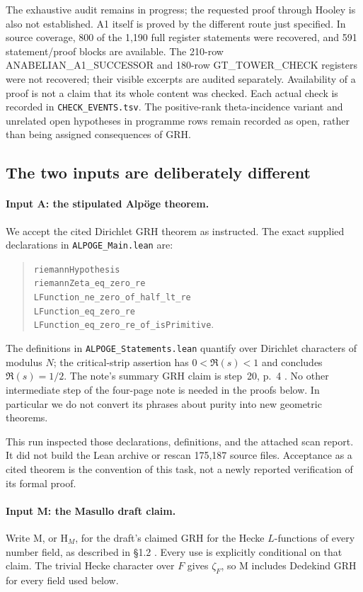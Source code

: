 \documentclass[11pt,a4paper]{article}
\begin{document}
The exhaustive audit remains in progress; the
requested proof through Hooley is also not established. A1 itself
is proved by the different route just specified. In source coverage,
800 of the 1,190 full register statements were recovered, and 591
statement/proof blocks are available. The 210-row
ANABELIAN\_A1\_SUCCESSOR and 180-row GT\_TOWER\_CHECK registers were not
recovered; their visible excerpts are audited separately. Availability
of a proof is not a claim that its whole content was checked. Each
actual check is recorded in \texttt{CHECK\_EVENTS.tsv}. The positive-rank
theta-incidence variant and unrelated open hypotheses in programme
rows remain recorded as open, rather than being assigned consequences
of GRH.

\subsection{The two inputs are deliberately different}

\paragraph{Input A: the stipulated Alp\"oge theorem.}
We accept the cited Dirichlet GRH theorem as instructed. The exact
supplied declarations in \texttt{ALPOGE\_Main.lean} are:
\begin{quote}\small\raggedright
\texttt{riemannHypothesis}\\
\texttt{riemannZeta\_eq\_zero\_re}\\
\texttt{LFunction\_ne\_zero\_of\_half\_lt\_re}\\
\texttt{LFunction\_eq\_zero\_re}\\
\texttt{LFunction\_eq\_zero\_re\_of\_isPrimitive}.
\end{quote}
The definitions in \texttt{ALPOGE\_Statements.lean} quantify over
Dirichlet characters of modulus $N$; the critical-strip assertion
has $0<\Re(s)<1$ and concludes $\Re(s)=1/2$.
The note's summary GRH claim is step~20, p.~4 \cite{Alpoge}.
No other intermediate step of the four-page note is needed in the
proofs below. In particular we do not convert its phrases about
purity into new geometric theorems.

This run inspected those declarations, definitions, and the attached
scan report. It did not build the Lean archive or rescan 175,187
source files. Acceptance as a cited theorem is the convention of
this task, not a newly reported verification of its formal proof.

\paragraph{Input M: the Masullo draft claim.}
Write M, or $\mathrm H_M$, for the draft's claimed GRH for the Hecke
$L$-functions of every number field, as described in \S1.2
\cite{Masullo}. Every use is explicitly conditional on that claim.
The trivial Hecke character over $F$ gives $\zeta_F$, so M includes
Dedekind GRH for every field used below.
\end{document}
